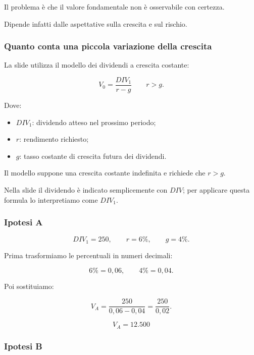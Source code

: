 \medskip

\noindent Il problema è che il valore fondamentale
non è osservabile con certezza.

\noindent Dipende infatti dalle aspettative
sulla crescita e sul rischio.


\subsubsection*{Quanto conta una piccola variazione della crescita}

\noindent La slide utilizza
il modello dei dividendi a crescita costante:

\[
\boxed{
V_0=\frac{DIV_1}{r-g}
}
\qquad r>g.
\]

\noindent Dove:

\begin{itemize}
    \item $DIV_1$: dividendo atteso
    nel prossimo periodo;

    \item $r$: rendimento richiesto;

    \item $g$: tasso costante di crescita futura
    dei dividendi.
\end{itemize}

\noindent Il modello suppone
una crescita costante indefinita
e richiede che $r>g$.

\noindent Nella slide il dividendo
è indicato semplicemente con $DIV$;
per applicare questa formula
lo interpretiamo come $DIV_1$.


\subsubsection*{Ipotesi A}

\[
DIV_1=250,
\qquad r=6\%,
\qquad g=4\%.
\]

\noindent Prima trasformiamo
le percentuali in numeri decimali:

\[
6\%=0{,}06,
\qquad
4\%=0{,}04.
\]

\noindent Poi sostituiamo:

\[
V_A
=
\frac{250}{0{,}06-0{,}04}
=
\frac{250}{0{,}02}.
\]

\[
\boxed{V_A=12.500}
\]


\subsubsection*{Ipotesi B}

